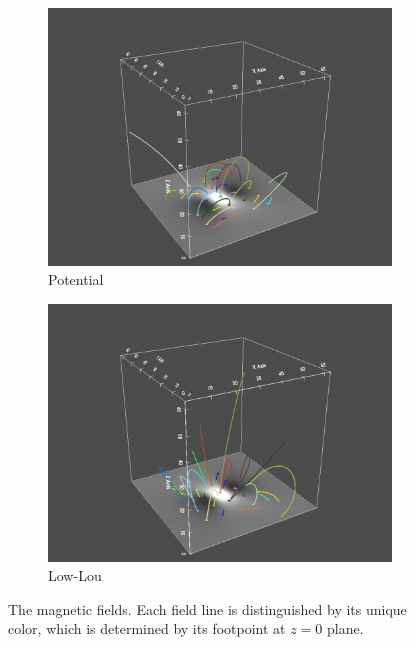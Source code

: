 \begin{figure}
  \begin{subfigure}{.5\linewidth}
    \centering
    \caption{Potential}
    \includegraphics[trim={6cm 0cm 6cm 3cm}, clip, width=\linewidth]{"img/LL_pot_xz_tilted.pdf"}
  \end{subfigure}%
  \begin{subfigure}{.5\linewidth}
    \centering
    \caption{Low-Lou}
    \includegraphics[trim={6cm 0cm 6cm 3cm}, clip, width=\linewidth]{"img/LL_xz_tilted.pdf"}
  \end{subfigure}
  
  \caption{The magnetic fields. Each field line is distinguished by its unique color, which is determined by its footpoint at $z=0$ plane.}\label{fig:xz_tilted}
\end{figure}


